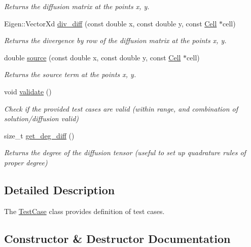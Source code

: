 \begin{DoxyCompactItemize}
\begin{DoxyCompactList}\small\item\em Returns the diffusion matrix at the points x, y. \end{DoxyCompactList}\item 
Eigen\+::\+Vector\+Xd \hyperlink{classTestCase_a1826d1e2781e2209512eac2dac5c84f7}{div\+\_\+diff} (const double x, const double y, const \hyperlink{classHArDCore2D_1_1Cell}{Cell} $\ast$cell)
\begin{DoxyCompactList}\small\item\em Returns the divergence by row of the diffusion matrix at the points x, y. \end{DoxyCompactList}\item 
double \hyperlink{classTestCase_a5b2e54e9f17ac2ec9c1d675f97fbe335}{source} (const double x, const double y, const \hyperlink{classHArDCore2D_1_1Cell}{Cell} $\ast$cell)
\begin{DoxyCompactList}\small\item\em Returns the source term at the points x, y. \end{DoxyCompactList}\item 
\mbox{\label{classTestCase_a1f428652eb476f6eb4973ef1f478e8ce}} 
void \hyperlink{classTestCase_a1f428652eb476f6eb4973ef1f478e8ce}{validate} ()
\begin{DoxyCompactList}\small\item\em Check if the provided test cases are valid (within range, and combination of solution/diffusion valid) \end{DoxyCompactList}\item 
size\+\_\+t \hyperlink{group__TestCases_ga3dd2daaebb012281b252ab65db0045b2}{get\+\_\+deg\+\_\+diff} ()
\begin{DoxyCompactList}\small\item\em Returns the degree of the diffusion tensor (useful to set up quadrature rules of proper degree) \end{DoxyCompactList}\end{DoxyCompactItemize}


\subsection{Detailed Description}
The \hyperlink{classTestCase}{Test\+Case} class provides definition of test cases. 

\subsection{Constructor \& Destructor Documentation}
\mbox{\label{classTestCase_aa4ad29533416ee515205db87002a1bf1}} 

